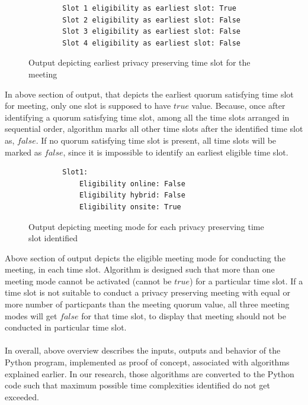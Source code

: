 \begin{figure}[H]  
    \centering
    \begin{verbatim}
        Slot 1 eligibility as earliest slot: True
        Slot 2 eligibility as earliest slot: False
        Slot 3 eligibility as earliest slot: False
        Slot 4 eligibility as earliest slot: False
    \end{verbatim}
    \caption{Output depicting earliest privacy preserving time slot for the meeting}
    \label{fig:output depicting earliest privacy preserving time slot for the meeting}
\end{figure} 
In above section of output, that depicts the earliest quorum satisfying time slot for meeting, only one slot is supposed to have $true$ value. Because, once after identifying a quorum satisfying time slot, among all the time slots arranged in sequential order, algorithm marks all other time slots after the identified time slot as, $false$. If no quorum satisfying time slot is present, all time slots will be marked as $false$, since it is impossible to identify an earliest eligible time slot.\\ 

\begin{figure}[H]  
    \centering
    \begin{verbatim}
        Slot1:
            Eligibility online: False
            Eligibility hybrid: False
            Eligibility onsite: True
    \end{verbatim}
    \caption{Output depicting meeting mode for each privacy preserving time slot identified}
    \label{fig:output depicting meeting mode for each privacy preserving time slot identified}
\end{figure} 
Above section of output depicts the eligible meeting mode for conducting the meeting, in each time slot. Algorithm is designed such that more than one meeting mode cannot be activated (cannot be $true$) for a particular time slot. If a time slot is not suitable to conduct a privacy preserving meeting with equal or more number of particpants than the meeting quorum value, all three meeting modes will get $false$ for that time slot, to display that meeting should not be conducted in particular time slot.\\ \\
In overall, above overview describes the inputs, outputs and behavior of the Python program, implemented as proof of concept, associated with algorithms explained earlier. In our research, those algorithms are converted to the Python code such that maximum possible time complexities identified do not get exceeded.\\ \\

